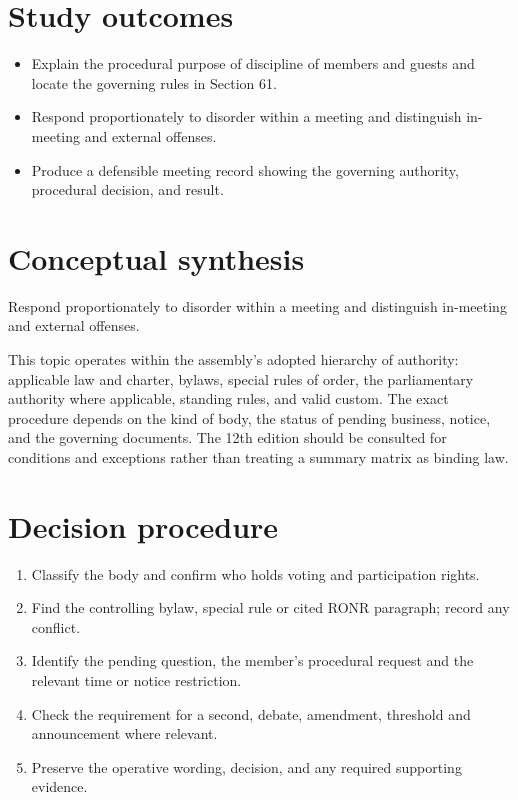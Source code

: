 \documentclass[11pt]{article}
\begin{document}
\SuiteOpen
{}
\section{Study outcomes}
\begin{itemize}[leftmargin=*,itemsep=4pt]
\item Explain the procedural purpose of discipline of members and guests and locate the governing rules in Section 61.
\item Respond proportionately to disorder within a meeting and distinguish in-meeting and external offenses.
\item Produce a defensible meeting record showing the governing authority, procedural decision, and result.
\end{itemize}

\section{Conceptual synthesis}
Respond proportionately to disorder within a meeting and distinguish in-meeting and external offenses.

This topic operates within the assembly’s adopted hierarchy of authority: applicable law and charter, bylaws, special rules of order, the parliamentary authority where applicable, standing rules, and valid custom. The exact procedure depends on the kind of body, the status of pending business, notice, and the governing documents. The 12th edition should be consulted for conditions and exceptions rather than treating a summary matrix as binding law.
\section{Decision procedure}
\begin{enumerate}[leftmargin=*,itemsep=4pt]
\item Classify the body and confirm who holds voting and participation rights.
\item Find the controlling bylaw, special rule or cited RONR paragraph; record any conflict.
\item Identify the pending question, the member’s procedural request and the relevant time or notice restriction.
\item Check the requirement for a second, debate, amendment, threshold and announcement where relevant.
\item Preserve the operative wording, decision, and any required supporting evidence.
\end{enumerate}
\end{document}

